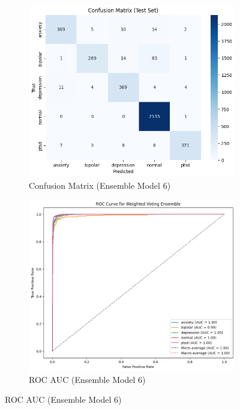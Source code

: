 \begin{figure}[h!]
    \centering
    \begin{subfigure}[b]{0.48\textwidth}
        \centering
        \includegraphics[width=\textwidth]{Images/WV CM.png}
        \caption*{Confusion Matrix (Ensemble Model 6)}
        \label{wv cm}  %
    \end{subfigure}
    \hfill
    \begin{subfigure}[b]{0.48\textwidth}
        \centering
        \includegraphics[width=\textwidth]{Images/WV ROC.png}
        \caption*{ROC AUC (Ensemble Model 6)}
        \label{wv roc}  %
    \end{subfigure}
    \label{fig:ensemble_model6_comparison}
\end{figure}

